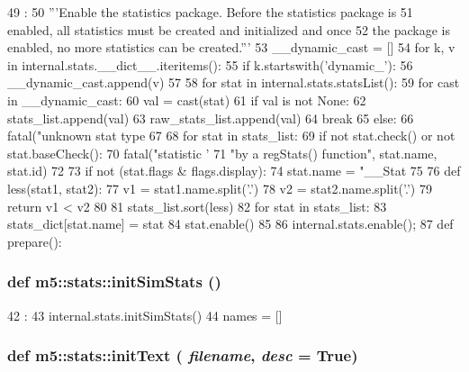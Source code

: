 \begin{DoxyCode}
49             :
50     '''Enable the statistics package.  Before the statistics package is
51     enabled, all statistics must be created and initialized and once
52     the package is enabled, no more statistics can be created.'''
53     __dynamic_cast = []
54     for k, v in internal.stats.__dict__.iteritems():
55         if k.startswith('dynamic_'):
56             __dynamic_cast.append(v)
57 
58     for stat in internal.stats.statsList():
59         for cast in __dynamic_cast:
60             val = cast(stat)
61             if val is not None:
62                 stats_list.append(val)
63                 raw_stats_list.append(val)
64                 break
65         else:
66             fatal("unknown stat type %
67 
68     for stat in stats_list:
69         if not stat.check() or not stat.baseCheck():
70             fatal("statistic '%
71                   "by a regStats() function\n", stat.name, stat.id)
72 
73         if not (stat.flags & flags.display):
74             stat.name = "__Stat%
75 
76     def less(stat1, stat2):
77         v1 = stat1.name.split('.')
78         v2 = stat2.name.split('.')
79         return v1 < v2
80 
81     stats_list.sort(less)
82     for stat in stats_list:
83         stats_dict[stat.name] = stat
84         stat.enable()
85 
86     internal.stats.enable();
87 
def prepare():
\end{DoxyCode}
\hypertarget{namespacem5_1_1stats_a5d626524a9640c1019937a3e1994e370}{
\subsubsection[{initSimStats}]{\setlength{\rightskip}{0pt plus 5cm}def m5::stats::initSimStats ()}}
\label{namespacem5_1_1stats_a5d626524a9640c1019937a3e1994e370}



\begin{DoxyCode}
42                   :
43     internal.stats.initSimStats()
44 
names = []
\end{DoxyCode}
\hypertarget{namespacem5_1_1stats_a31642248b580dfb85a72a918738e3fb1}{
\subsubsection[{initText}]{\setlength{\rightskip}{0pt plus 5cm}def m5::stats::initText ( {\em filename}, \/   {\em desc} = {\ttfamily True})}}
\label{namespacem5_1_1stats_a31642248b580dfb85a72a918738e3fb1}



